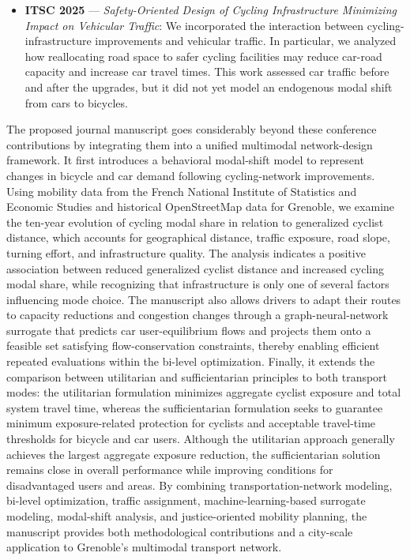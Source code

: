 \documentclass[11pt]{letter}
\begin{document}
\begin{letter}
\begin{itemize}
    \item \textbf{ITSC 2025} --- \textit{Safety-Oriented Design of Cycling
    Infrastructure Minimizing Impact on Vehicular Traffic}:
    We incorporated the interaction between cycling-infrastructure
    improvements and vehicular traffic. In particular, we analyzed how
    reallocating road space to safer cycling facilities may reduce car-road
    capacity and increase car travel times. This work assessed car traffic
    before and after the upgrades, but it did not yet model an endogenous
    modal shift from cars to bicycles.
\end{itemize}
The proposed journal manuscript goes considerably beyond these conference contributions by integrating them into a unified multimodal network-design framework. It first introduces a behavioral modal-shift model to represent changes in bicycle and car demand following cycling-network improvements. Using mobility data from the French National Institute of Statistics and Economic Studies and historical OpenStreetMap data for Grenoble, we examine the ten-year evolution of cycling modal share in relation to generalized cyclist distance, which accounts for geographical distance, traffic exposure, road slope, turning effort, and infrastructure quality. The analysis indicates a positive association between reduced generalized cyclist distance and increased cycling modal share, while recognizing that infrastructure is only one of several factors influencing mode choice. The manuscript also allows drivers to adapt their routes to capacity reductions and congestion changes through a graph-neural-network surrogate that predicts car user-equilibrium flows and projects them onto a feasible set satisfying flow-conservation constraints, thereby enabling efficient repeated evaluations within the bi-level optimization. Finally, it extends the comparison between utilitarian and sufficientarian principles to both transport modes: the utilitarian formulation minimizes aggregate cyclist exposure and total system travel time, whereas the sufficientarian formulation seeks to guarantee minimum exposure-related protection for cyclists and acceptable travel-time thresholds for bicycle and car users. Although the utilitarian approach generally achieves the largest aggregate exposure reduction, the sufficientarian solution remains close in overall performance while improving conditions for disadvantaged users and areas. By combining transportation-network modeling, bi-level optimization, traffic assignment, machine-learning-based surrogate modeling, modal-shift analysis, and justice-oriented mobility planning, the manuscript provides both methodological contributions and a city-scale application to Grenoble’s multimodal transport network.

\end{letter}
\end{document}
